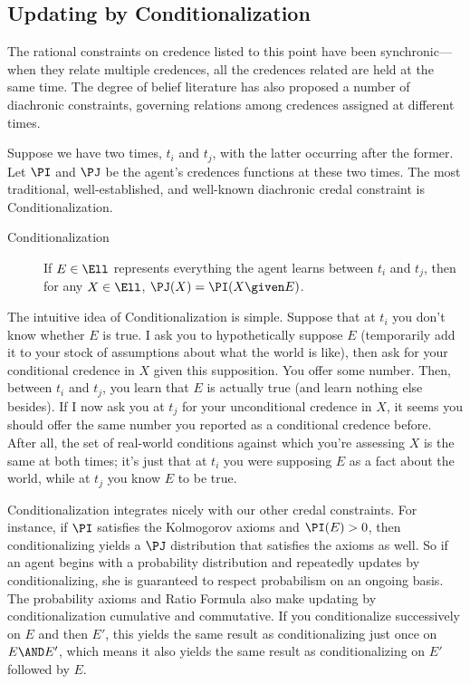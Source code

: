 \subsection{Updating by Conditionalization} \label{ss:Cond}
The rational constraints on credence listed to this point have been synchronic---when they relate multiple credences, all the credences related are held at the same time. The degree of belief literature has also proposed a number of diachronic constraints, governing relations among credences assigned at different times.

Suppose we have two times, $t_i$ and $t_j$, with the latter occurring after the former. Let $\PI$ and $\PJ$ be the agent's credences functions at these two times. The most traditional, well-established, and well-known diachronic credal constraint is Conditionalization.
\begin{description}
\item[Conditionalization]{If $E \in \Ell$ represents everything the agent learns between $t_i$ and $t_j$, then for any $X \in \Ell$, $\PJ(X)=\PI(X \given E)$.}
\end{description}
The intuitive idea of Conditionalization is simple. Suppose that at $t_i$ you don't know whether $E$ is true. I ask you to hypothetically suppose $E$ (temporarily add it to your stock of assumptions about what the world is like), then ask for your conditional credence in $X$ given this supposition. You offer some number. Then, between $t_i$ and $t_j$, you learn that $E$ is actually true (and learn nothing else besides). If I now ask you at $t_j$ for your unconditional credence in $X$, it seems you should offer the same number you reported as a conditional credence before. After all, the set of real-world conditions against which you're assessing $X$ is the same at both times; it's just that at $t_i$ you were supposing $E$ as a fact about the world, while at $t_j$ you know $E$ to be true.

Conditionalization integrates nicely with our other credal constraints. For instance, if $\PI$ satisfies the Kolmogorov axioms and $\PI(E)>0$, then conditionalizing yields a $\PJ$ distribution that satisfies the axioms as well. So if an agent begins with a probability distribution and repeatedly updates by conditionalizing, she is guaranteed to respect probabilism on an ongoing basis. The probability axioms and Ratio Formula also make updating by conditionalization cumulative and commutative. If you conditionalize successively on $E$ and then $E'$, this yields the same result as conditionalizing just once on $E \AND E'$, which means it also yields the same result as conditionalizing on $E'$ followed by $E$.      

